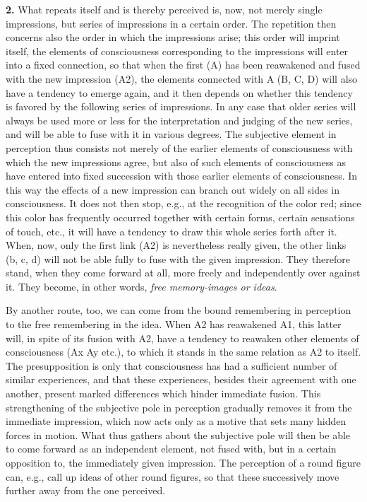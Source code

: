 \documentclass[12pt,a4paper]{book}
\newcommand{\opage}[1]{\marginnote{\footnotesize\textit{[#1]}}}
\begin{document}
\textbf{2.} What repeats itself and is thereby perceived is, now, not
merely single impressions, but series of impressions in a certain order.
The repetition then concerns also the order in which the impressions
arise; this order will imprint itself, the elements of consciousness
corresponding to the impressions will enter into a fixed connection, so
that when the first (A) has been reawakened and fused with the new
impression (A2), the elements connected with A (B, C, D) will also have a
tendency to emerge again, and it then depends on whether this tendency is
favored by the following series of impressions. In any case that older
series will always be used more or less for the interpretation and
judging of the new series, and will be able to fuse with it in various
degrees. The subjective element in perception thus consists not merely of
the earlier elements of consciousness with which the new impressions
agree, but also of such elements of consciousness as have entered into
fixed succession with those earlier elements of consciousness. In this
way the effects of a new impression can branch out widely on all sides in
consciousness. It does not then stop, e.g., at the recognition of the
color red; since this color has frequently occurred together with certain
forms, certain sensations of touch, etc., it will have a tendency to draw
this whole series forth after it. When, now, only the first link (A2) is
nevertheless really given, the other links (b, c, d) will not be able
fully to fuse with the given impression. They therefore stand, when they
come forward at all, more freely and independently over against it. They
become, in other words, \emph{free memory-images or ideas}.

By another route, too, we can come from the bound remembering in
perception to the free remembering in the idea. When A2 has reawakened
A1, this latter will, in spite of its fusion with A2, have a tendency to
reawaken other elements of consciousness (Ax Ay etc.), to which it stands
in the same relation as A2 to itself. The presupposition is only that
consciousness has had a sufficient number of similar experiences, and that
these experiences, besides their agreement with one another, present
marked differences which
\opage{156}hinder immediate fusion. This strengthening of the subjective
pole in perception gradually removes it from the immediate impression,
which now acts only as a motive that sets many hidden forces in motion.
What thus gathers about the subjective pole will then be able to come
forward as an independent element, not fused with, but in a certain
opposition to, the immediately given impression. The perception of a round
figure can, e.g., call up ideas of other round figures, so that these
successively move further away from the one perceived.
\end{document}
